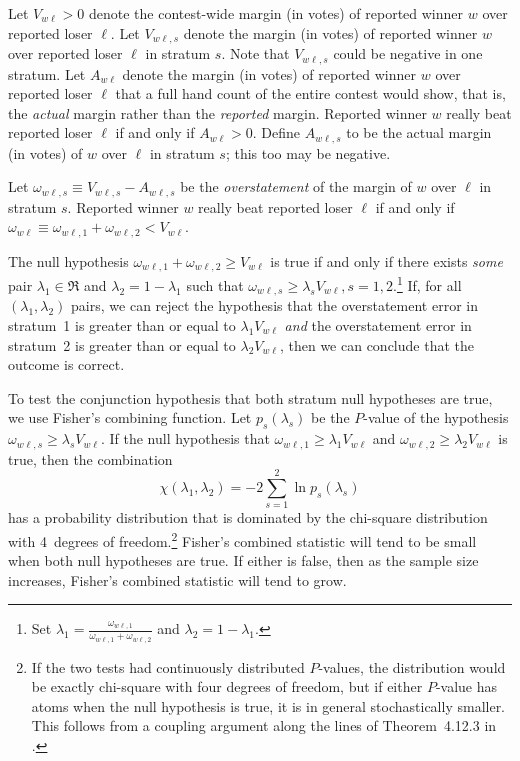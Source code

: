 \documentclass[runningheads]{llncs}
\newcommand{\beq}{\begin{equation}}
\newcommand{\eeq}{\end{equation}}
\begin{document}
Let $V_{w\ell} > 0$ denote the contest-wide margin (in votes) of reported winner 
$w$ over reported loser
$\ell$.
Let $V_{w\ell,s}$ denote the margin (in votes) of reported winner $w$ over reported loser $\ell$
in stratum $s$. 
Note that $V_{w\ell,s}$ could be negative in one stratum.
Let $A_{w\ell}$ denote the margin (in votes)
of reported winner $w$ over reported loser $\ell$ that 
a full hand count of the entire contest would show, that is, the \emph{actual} margin rather
than the \emph{reported} margin.
Reported winner $w$ really beat reported loser $\ell$ if and only if $A_{w\ell} > 0$.
Define $A_{w\ell,s}$ to be the actual margin (in votes) of $w$ over $\ell$ in stratum $s$;
this too may be negative.

Let $\omega_{w\ell,s} \equiv V_{w\ell,s} - A_{w\ell,s}$ be the \emph{overstatement}
of the margin of $w$ over $\ell$ in stratum $s$.
Reported winner $w$ really beat reported loser 
$\ell$ if and only if $\omega_{w\ell} \equiv \omega_{w\ell,1} + \omega_{w\ell,2} < V_{w\ell}$.

The null hypothesis $\omega_{w\ell, 1} + \omega_{w\ell, 2} \ge V_{w\ell}$ is true if and only if there exists \textit{some} pair $\lambda_1 \in \Re$ and $\lambda_2 = 1-\lambda_1$ such that $\omega_{w\ell, s}\ge \lambda_s V_{w\ell}, s=1, 2$.\footnote{
Set $\lambda_1 = \frac{\omega_{w\ell, 1}}{\omega_{w\ell, 1}+\omega_{w\ell, 2}}$ and $\lambda_2 = 1-\lambda_1$.
}
If, for all $(\lambda_1, \lambda_2)$ pairs, we can reject the hypothesis that the 
overstatement error in stratum~1 is greater than or equal to $\lambda_1 V_{w\ell}$ \emph{and} 
the overstatement error in stratum~2 is greater than or equal to $\lambda_2 V_{w\ell}$, then
we can conclude that the outcome is correct.

To test the conjunction hypothesis that both stratum null hypotheses are true, we use 
Fisher's combining function.
Let $p_s(\lambda_s)$ be the $P$-value of the hypothesis $\omega_{w\ell,s} \ge \lambda_s V_{w\ell}$.
If the null hypothesis that $\omega_{w\ell,1} \ge \lambda_1 V_{w\ell}$ and 
$\omega_{w\ell,2} \ge \lambda_2 V_{w\ell}$ is true, then the combination
\beq
   \chi(\lambda_1, \lambda_2) = -2 \sum_{s=1}^2 \ln p_s(\lambda_s)
\eeq
has a probability distribution that is dominated by the chi-square distribution with 4~degrees
of freedom.\footnote{%
   If the two tests had continuously distributed $P$-values, the distribution would be exactly
   chi-square with four degrees of freedom, but if either $P$-value has atoms when
   the null hypothesis is true, it is in general stochastically smaller.
   This follows from a coupling argument along the lines of Theorem~4.12.3 in \cite{grimmett01}.
}
Fisher's combined statistic will tend to be small when both null hypotheses are true.
If either is false, then as the sample size increases, Fisher's combined statistic will tend to grow.
\end{document}
